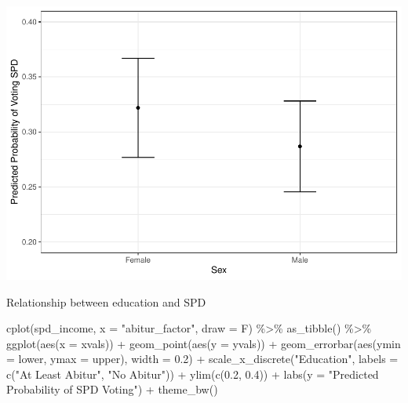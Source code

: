 \documentclass[
]{article}
\newenvironment{Shaded}{\begin{snugshade}}{\end{snugshade}}
\newcommand{\AttributeTok}[1]{\textcolor[rgb]{0.77,0.63,0.00}{#1}}
\newcommand{\FloatTok}[1]{\textcolor[rgb]{0.00,0.00,0.81}{#1}}
\newcommand{\FunctionTok}[1]{\textcolor[rgb]{0.00,0.00,0.00}{#1}}
\newcommand{\NormalTok}[1]{#1}
\newcommand{\SpecialCharTok}[1]{\textcolor[rgb]{0.00,0.00,0.00}{#1}}
\newcommand{\StringTok}[1]{\textcolor[rgb]{0.31,0.60,0.02}{#1}}
\begin{document}
\includegraphics{AVCD_Final_Assignment-Edenhofer_files/figure-latex/spd-sex-1.pdf}

Relationship between education and SPD

\begin{Shaded}
\begin{Highlighting}[]
\FunctionTok{cplot}\NormalTok{(spd\_income, }\AttributeTok{x =} \StringTok{"abitur\_factor"}\NormalTok{, }\AttributeTok{draw =}\NormalTok{ F) }\SpecialCharTok{\%\textgreater{}\%}
  \FunctionTok{as\_tibble}\NormalTok{() }\SpecialCharTok{\%\textgreater{}\%}
  \FunctionTok{ggplot}\NormalTok{(}\FunctionTok{aes}\NormalTok{(}\AttributeTok{x =}\NormalTok{ xvals)) }\SpecialCharTok{+}
  \FunctionTok{geom\_point}\NormalTok{(}\FunctionTok{aes}\NormalTok{(}\AttributeTok{y =}\NormalTok{ yvals)) }\SpecialCharTok{+}
  \FunctionTok{geom\_errorbar}\NormalTok{(}\FunctionTok{aes}\NormalTok{(}\AttributeTok{ymin =}\NormalTok{ lower, }\AttributeTok{ymax =}\NormalTok{ upper), }\AttributeTok{width =} \FloatTok{0.2}\NormalTok{) }\SpecialCharTok{+} 
  \FunctionTok{scale\_x\_discrete}\NormalTok{(}\StringTok{"Education"}\NormalTok{, }\AttributeTok{labels =} \FunctionTok{c}\NormalTok{(}\StringTok{"At Least Abitur"}\NormalTok{, }\StringTok{"No Abitur"}\NormalTok{)) }\SpecialCharTok{+}
  \FunctionTok{ylim}\NormalTok{(}\FunctionTok{c}\NormalTok{(}\FloatTok{0.2}\NormalTok{, }\FloatTok{0.4}\NormalTok{)) }\SpecialCharTok{+}
  \FunctionTok{labs}\NormalTok{(}\AttributeTok{y =} \StringTok{"Predicted Probability of SPD Voting"}\NormalTok{) }\SpecialCharTok{+}
  \FunctionTok{theme\_bw}\NormalTok{()}
\end{Highlighting}
\end{Shaded}
\end{document}
